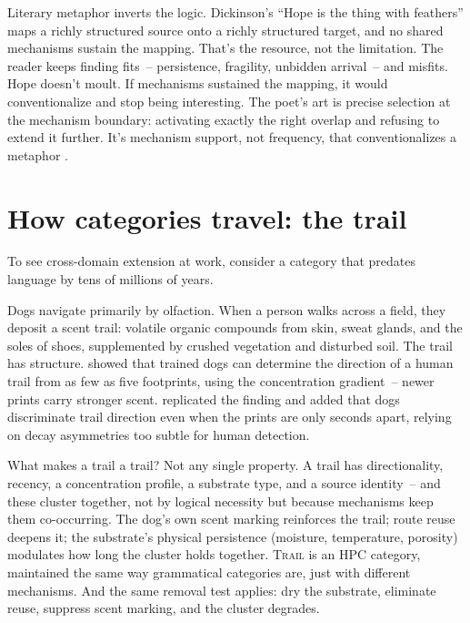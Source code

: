 Literary metaphor inverts the logic. Dickinson's \enquote{Hope is the thing with feathers} maps a richly structured source onto a richly structured target, and no shared mechanisms sustain the mapping. That's the resource, not the limitation. The reader keeps finding fits~-- persistence, fragility, unbidden arrival~-- and misfits. Hope doesn't moult. If mechanisms sustained the mapping, it would conventionalize and stop being interesting. The poet's art is precise selection at the mechanism boundary: activating exactly the right overlap and refusing to extend it further. It's mechanism support, not frequency, that conventionalizes a metaphor \citep[see][for the full argument]{reynolds2026metaphor}.

\section{How categories travel: the trail}
\label{sec:17:trail}

To see cross-domain extension at work, consider a category that predates language by tens of millions of years.

Dogs navigate primarily by olfaction. When a person walks across a field, they deposit a scent trail: volatile organic compounds from skin, sweat glands, and the soles of shoes, supplemented by crushed vegetation and disturbed soil. The trail has structure. \textcite{thesen1993} showed that trained dogs can determine the direction of a human trail from as few as five footprints, using the concentration gradient~-- newer prints carry stronger scent. \textcite{hepper2005} replicated the finding and added that dogs discriminate trail direction even when the prints are only seconds apart, relying on decay asymmetries too subtle for human detection.

What makes a trail a trail? Not any single property. A trail has directionality, recency, a concentration profile, a substrate type, and a source identity~-- and these cluster together, not by logical necessity but because mechanisms keep them co-occurring. The dog's own scent marking reinforces the trail; route reuse deepens it; the substrate's physical persistence (moisture, temperature, porosity) modulates how long the cluster holds together. \textsc{Trail} is an HPC category, maintained the same way grammatical categories are, just with different mechanisms. And the same removal test applies: dry the substrate, eliminate reuse, suppress scent marking, and the cluster degrades.

